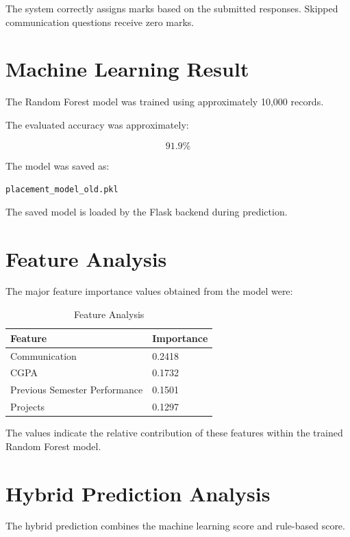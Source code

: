 \documentclass[12pt,a4paper]{report}
\begin{document}
The system correctly assigns marks based on the submitted
responses. Skipped communication questions receive zero marks.

\section{Machine Learning Result}

The Random Forest model was trained using approximately 10,000
records.

The evaluated accuracy was approximately:

\[
\boxed{91.9\%}
\]

The model was saved as:

\begin{center}
\texttt{placement\_model\_old.pkl}
\end{center}

The saved model is loaded by the Flask backend during prediction.

\section{Feature Analysis}

The major feature importance values obtained from the model were:

\begin{table}[H]
\centering
\caption{Feature Analysis}

\begin{tabular}{p{}p{}}
\toprule
\textbf{Feature} & \textbf{Importance} \\
\midrule
Communication & 0.2418 \\
CGPA & 0.1732 \\
Previous Semester Performance & 0.1501 \\
Projects & 0.1297 \\
\bottomrule
\end{tabular}
\end{table}

The values indicate the relative contribution of these features
within the trained Random Forest model.

\section{Hybrid Prediction Analysis}

The hybrid prediction combines the machine learning score and
rule-based score.
\end{document}
